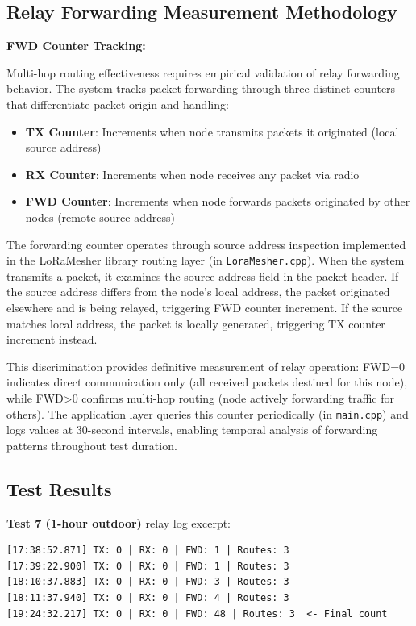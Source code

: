 \subsection{Relay Forwarding Measurement Methodology}
\label{sec:relay-forwarding}

\textbf{FWD Counter Tracking:}

Multi-hop routing effectiveness requires empirical validation of relay forwarding behavior. The system tracks packet forwarding through three distinct counters that differentiate packet origin and handling:

\begin{itemize}
\item \textbf{TX Counter}: Increments when node transmits packets it originated (local source address)
\item \textbf{RX Counter}: Increments when node receives any packet via radio
\item \textbf{FWD Counter}: Increments when node forwards packets originated by other nodes (remote source address)
\end{itemize}

The forwarding counter operates through source address inspection implemented in the LoRaMesher library routing layer (in \texttt{LoraMesher.cpp}). When the system transmits a packet, it examines the source address field in the packet header. If the source address differs from the node's local address, the packet originated elsewhere and is being relayed, triggering FWD counter increment. If the source matches local address, the packet is locally generated, triggering TX counter increment instead.

This discrimination provides definitive measurement of relay operation: FWD=0 indicates direct communication only (all received packets destined for this node), while FWD>0 confirms multi-hop routing (node actively forwarding traffic for others). The application layer queries this counter periodically (in \texttt{main.cpp}) and logs values at 30-second intervals, enabling temporal analysis of forwarding patterns throughout test duration.

\subsection{Test Results}

\textbf{Test 7 (1-hour outdoor)} relay log excerpt:

\begin{verbatim}
[17:38:52.871] TX: 0 | RX: 0 | FWD: 1 | Routes: 3
[17:39:22.900] TX: 0 | RX: 0 | FWD: 1 | Routes: 3
[18:10:37.883] TX: 0 | RX: 0 | FWD: 3 | Routes: 3
[18:11:37.940] TX: 0 | RX: 0 | FWD: 4 | Routes: 3
[19:24:32.217] TX: 0 | RX: 0 | FWD: 48 | Routes: 3  <- Final count
\end{verbatim}

